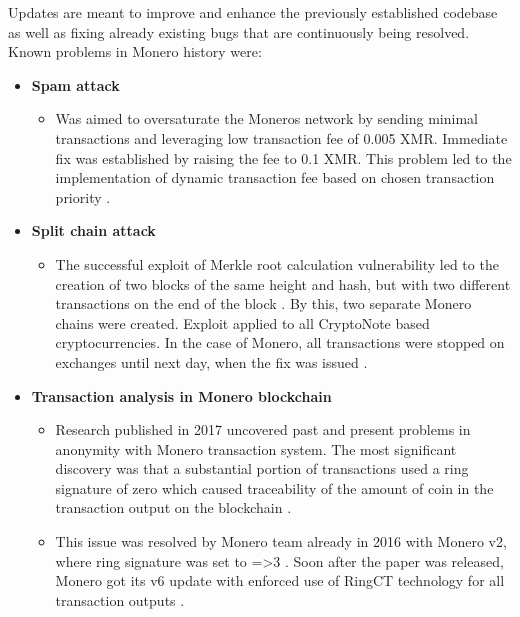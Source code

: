 \documentclass[
  printed, %
  table,   %
  nolof,     %
  nolot,     %
           oneside, color
]{fithesis3}
\begin{document}
Updates are meant to improve and enhance the previously established codebase as well as fixing already existing bugs that are continuously being resolved. Known problems in Monero history were:

\begin{itemize}
\item \textbf{Spam attack}
\begin{itemize}
\item Was aimed to oversaturate the Moneros network by sending minimal transactions and leveraging low transaction fee of 0.005 XMR. Immediate fix was established by raising the fee to 0.1 XMR. This problem led to the implementation of dynamic transaction fee based on chosen transaction priority \cite{monerospamattack}.
\end{itemize}
\item \textbf{Split chain attack}
\begin{itemize}
\item The successful exploit of Merkle root calculation vulnerability led to the creation of two blocks of the same height and hash, but with two different transactions on the end of the block \cite{macheta2014counterfeiting}. By this, two separate Monero chains were created. Exploit applied to all CryptoNote based cryptocurrencies. In the case of Monero, all transactions were stopped on exchanges until next day, when the fix was issued \cite{cryptonotemerkletree}.
\end{itemize}
\item \textbf{Transaction analysis in Monero blockchain}
\begin{itemize}
\item Research published in 2017 uncovered past and present problems in anonymity with Monero transaction system. The most significant discovery was that a substantial portion of transactions used a ring signature of zero which caused traceability of the amount of coin in the transaction output on the blockchain \cite{moser2018empirical}.
\item This issue was resolved by Monero team already in 2016 with Monero v2, where ring signature was set to =>3 \cite{monerov2release}. Soon after the paper was released, Monero got its v6 update with enforced use of RingCT technology for all transaction outputs \cite{monerov6release}.
\end{itemize}
\end{itemize}
\newpage
\end{document}
